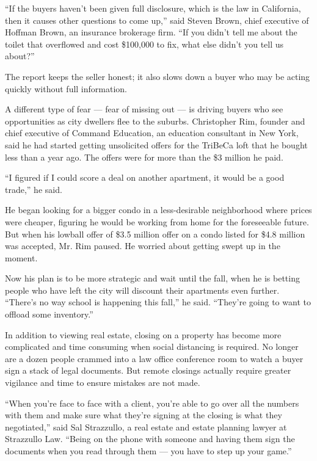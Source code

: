 ``If the buyers haven't been given full disclosure, which is the law in
California, then it causes other questions to come up,'' said Steven
Brown, chief executive of Hoffman Brown, an insurance brokerage firm.
``If you didn't tell me about the toilet that overflowed and cost
\$100,000 to fix, what else didn't you tell us about?''

The report keeps the seller honest; it also slows down a buyer who may
be acting quickly without full information.

A different type of fear --- fear of missing out --- is driving buyers
who see opportunities as city dwellers flee to the suburbs. Christopher
Rim, founder and chief executive of Command Education, an education
consultant in New York, said he had started getting unsolicited offers
for the TriBeCa loft that he bought less than a year ago. The offers
were for more than the \$3 million he paid.

``I figured if I could score a deal on another apartment, it would be a
good trade,'' he said.

He began looking for a bigger condo in a less-desirable neighborhood
where prices were cheaper, figuring he would be working from home for
the foreseeable future. But when his lowball offer of \$3.5 million
offer on a condo listed for \$4.8 million was accepted, Mr. Rim paused.
He worried about getting swept up in the moment.

Now his plan is to be more strategic and wait until the fall, when he is
betting people who have left the city will discount their apartments
even further. ``There's no way school is happening this fall,'' he said.
``They're going to want to offload some inventory.''

In addition to viewing real estate, closing on a property has become
more complicated and time consuming when social distancing is required.
No longer are a dozen people crammed into a law office conference room
to watch a buyer sign a stack of legal documents. But remote closings
actually require greater vigilance and time to ensure mistakes are not
made.

``When you're face to face with a client, you're able to go over all the
numbers with them and make sure what they're signing at the closing is
what they negotiated,'' said Sal Strazzullo, a real estate and estate
planning lawyer at Strazzullo Law. ``Being on the phone with someone and
having them sign the documents when you read through them --- you have
to step up your game.''

